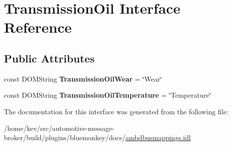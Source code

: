 \hypertarget{interfaceTransmissionOil}{\section{Transmission\+Oil Interface Reference}
\label{interfaceTransmissionOil}
}
\subsection*{Public Attributes}
\begin{DoxyCompactItemize}
\item 
\hypertarget{interfaceTransmissionOil_ac6a359c9ab6e301e755ac596cc17d9c5}{const D\+O\+M\+String {\bfseries Transmission\+Oil\+Wear} = \char`\"{}Wear\char`\"{}}\label{interfaceTransmissionOil_ac6a359c9ab6e301e755ac596cc17d9c5}

\item 
\hypertarget{interfaceTransmissionOil_a4c80a5b4e084867bcac6697ba0eca6ab}{const D\+O\+M\+String {\bfseries Transmission\+Oil\+Temperature} = \char`\"{}Temperature\char`\"{}}\label{interfaceTransmissionOil_a4c80a5b4e084867bcac6697ba0eca6ab}

\end{DoxyCompactItemize}


The documentation for this interface was generated from the following file\+:\begin{DoxyCompactItemize}
\item 
/home/kev/src/automotive-\/message-\/broker/build/plugins/bluemonkey/docs/\hyperlink{ambdbusmappings_8idl}{ambdbusmappings.\+idl}\end{DoxyCompactItemize}
